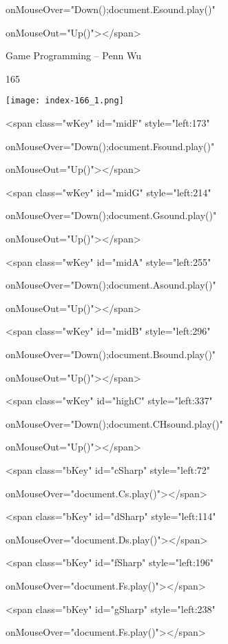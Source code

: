 \documentclass[
]{article}
\begin{document}
onMouseOver="Down();document.Esound.play()"

onMouseOut="Up()"\textgreater\textless/span\textgreater{}

Game Programming -- Penn Wu

165

\protect\hypertarget{index_split_010.htmlux5cux23p166}{}{}\texttt{[image: index-166\_1.png]}

\textless span class="wKey" id="midF" style="left:173"

onMouseOver="Down();document.Fsound.play()"

onMouseOut="Up()"\textgreater\textless/span\textgreater{}

\textless span class="wKey" id="midG" style="left:214"

onMouseOver="Down();document.Gsound.play()"

onMouseOut="Up()"\textgreater\textless/span\textgreater{}

\textless span class="wKey" id="midA" style="left:255"

onMouseOver="Down();document.Asound.play()"

onMouseOut="Up()"\textgreater\textless/span\textgreater{}

\textless span class="wKey" id="midB" style="left:296"

onMouseOver="Down();document.Bsound.play()"

onMouseOut="Up()"\textgreater\textless/span\textgreater{}

\textless span class="wKey" id="highC" style="left:337"

onMouseOver="Down();document.CHsound.play()"

onMouseOut="Up()"\textgreater\textless/span\textgreater{}

\textless span class="bKey" id="cSharp" style="left:72"

onMouseOver="document.Cs.play()"\textgreater\textless/span\textgreater{}

\textless span class="bKey" id="dSharp" style="left:114"

onMouseOver="document.Ds.play()"\textgreater\textless/span\textgreater{}

\textless span class="bKey" id="fSharp" style="left:196"

onMouseOver="document.Fs.play()"\textgreater\textless/span\textgreater{}

\textless span class="bKey" id="gSharp" style="left:238"

onMouseOver="document.Fs.play()"\textgreater\textless/span\textgreater{}
\end{document}
